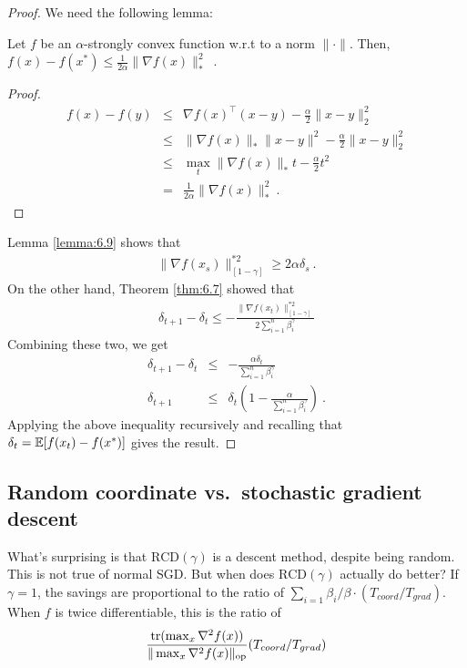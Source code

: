 	\begin{proof} We need the following lemma:
  \begin{lemma}
    \label{lemma:6.9} 
    Let $f$ be an $\alpha$-strongly convex function w.r.t to a norm
    $\|\cdot\|$. Then, $f(x) - f(x^*) \le \frac{1}{2\alpha} \|\nabla
    f(x)\|_*^2$\ .
	 \end{lemma}
	 \begin{proof}
	 \begin{eqnarray*}
     f(x) - f(y)
     &\le& \nabla f(x)^\top (x -y ) - \frac{\alpha}{2}\|x - y\|^2_2\\
	   &\le& \|\nabla f(x)\|_* \|x - y\|^2 - \frac{\alpha}{2}\|x - y\|^2_2\\
	   &\le& \max_t \|\nabla f(x)\|_* t - \frac{\alpha}{2}t^2\\
	 	 &=&  \frac{1}{2\alpha} \|\nabla f(x)\|_*^2 \ .
	 \end{eqnarray*}
	 \end{proof}

   Lemma \ref{lemma:6.9} shows that 
	 \begin{eqnarray*}
     \|\nabla f(x_s)\|^{*2}_{[1-\gamma]}
     \ge 2 \alpha \delta_s \ .
	 \end{eqnarray*}
   On the other hand, Theorem \ref{thm:6.7} showed that
   \begin{eqnarray}
   \delta_{t+1} - \delta_t \le -\frac{\|\nabla f(x_t)\|^{*2}_{[1-\gamma]}}{2\sum_{i=1}^n \beta_i^{\gamma}} 
   \end{eqnarray}
   Combining these two, we get
	 \begin{eqnarray}
     \delta_{t+1} - \delta_t &\le& -\frac{\alpha \delta_t}{\sum_{i=1}^n \beta_i^{\gamma}}  \\
     \delta_{t+1} &\le&  \delta_t \left(1  -\frac{\alpha}{\sum_{i=1}^n \beta_i^{\gamma}} \right)~.
	 \end{eqnarray}
   Applying the above inequality recursively and recalling that
   $\delta_t = \operatorname*{\mathbb{E}}[f(x_t) - f(x^*)]$ gives the result.

	\end{proof}

	\subsection{Random coordinate vs.~stochastic gradient descent}
	What's surprising is that $\mathrm{RCD}(\gamma)$ is a descent method, despite being random. This is not true of normal SGD. 
	But when does $\mathrm{RCD}(\gamma)$ actually do better? If $\gamma = 1$, the savings are proportional to the ratio of $\sum_{i=1} \beta_i / \beta \cdot (T_{coord}/T_{grad})$. When $f$ is twice differentiable, this is the ratio of 
	\begin{eqnarray}
	\frac{\mathrm{tr}(\max_{x} \nabla^2 f(x))}{\|\max_{x} \nabla^2 f(x)\|_{\mathrm{op}}} (T_{coord}/T_{grad})
	\end{eqnarray}
